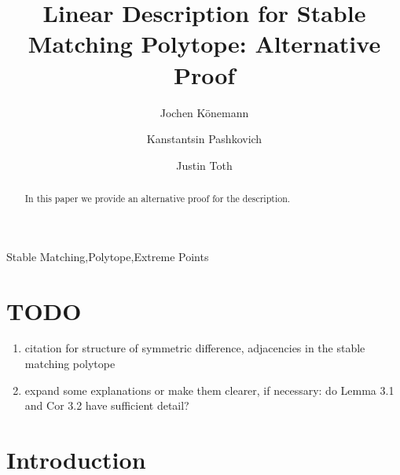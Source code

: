 \documentclass[preprint]{elsarticle}
\begin{document}
\begin{frontmatter}



\title{Linear Description for Stable Matching Polytope: Alternative Proof}
\author[co]{Jochen K\"{o}nemann}
\author[co]{Kanstantsin Pashkovich}
\author[co]{Justin Toth}
\address[co]{Department of Combinatorics and Optimization, University of Waterloo, Canada}


\begin{abstract}
In this paper we provide an alternative proof for the description.
\end{abstract}
\begin{keyword}
Stable Matching\sep Polytope\sep Extreme Points
\end{keyword}
\end{frontmatter}
{\color{red}
\section*{TODO}
\begin{enumerate}
	\item citation for structure of symmetric difference, adjacencies in the stable matching polytope
	\item expand some explanations or make them clearer, if necessary: do Lemma 3.1 and Cor 3.2 have sufficient detail?
\end{enumerate}
}

\section{Introduction}
\end{document}
